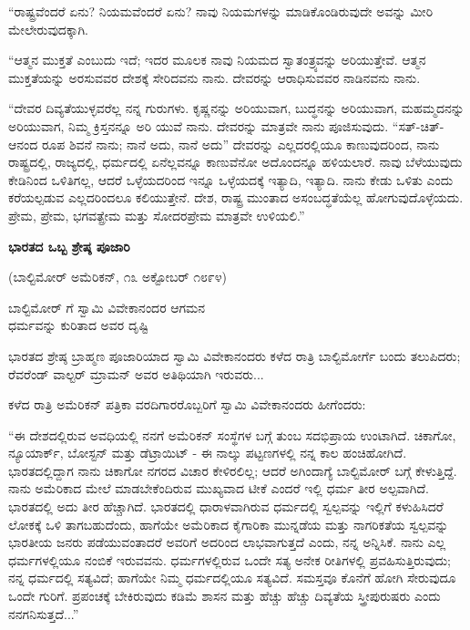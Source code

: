 “ರಾಷ್ಟ್ರವೆಂದರೆ ಏನು? ನಿಯಮವೆಂದರೆ ಏನು? ನಾವು ನಿಯಮಗಳನ್ನು ಮಾಡಿಕೊಂಡಿರುವುದೇ ಅವನ್ನು ಮೀರಿ ಮೇಲೇರುವುದಕ್ಕಾಗಿ.

“ಆತ್ಮನ ಮುಕ್ತತೆ ಎಂಬುದು ಇದೆ; ಇದರ ಮೂಲಕ ನಾವು ನಿಯಮದ ಸ್ವಾತಂತ್ರ್ಯವನ್ನು ಅರಿಯುತ್ತೇವೆ. ಆತ್ಮನ ಮುಕ್ತತೆಯನ್ನು ಅರಸುವವರ ದೇಶಕ್ಕೆ ಸೇರಿದವನು ನಾನು. ದೇವರನ್ನು ಆರಾಧಿಸುವವರ ನಾಡಿನವನು ನಾನು.

“ದೇವರ ದಿವ್ಯತೆಯುಳ್ಳವರೆಲ್ಲ ನನ್ನ ಗುರುಗಳು. ಕೃಷ್ಣನನ್ನು ಅರಿಯುವಾಗ, ಬುದ್ಧನನ್ನು ಅರಿಯುವಾಗ, ಮಹಮ್ಮದನನ್ನು ಅರಿಯುವಾಗ, ನಿಮ್ಮ ಕ್ರಿಸ್ತನನ್ನೂ ಅರಿ ಯುವೆ ನಾನು. ದೇವರನ್ನು ಮಾತ್ರವೇ ನಾನು ಪೂಜಿಸುವುದು. “ಸತ್-ಚಿತ್- ಆನಂದ ರೂಪ ಶಿವನೆ ನಾನು; ನಾನೆ ಅದು, ನಾನೆ ಅದು” ದೇವರನ್ನು ಎಲ್ಲದರಲ್ಲಿಯೂ ಕಾಣುವುದರಿಂದ, ನಾನು ರಾಷ್ಟ್ರದಲ್ಲಿ, ರಾಜ್ಯದಲ್ಲಿ, ಧರ್ಮದಲ್ಲಿ ಏನೆಲ್ಲವನ್ನೂ ಕಾಣುವೆನೋ ಅದೊಂದನ್ನೂ ಹಳಿಯಲಾರೆ. ನಾವು ಬೆಳೆಯುವುದು ಕೇಡಿನಿಂದ ಒಳಿತಿಗಲ್ಲ, ಆದರೆ ಒಳ್ಳೆಯದರಿಂದ ಇನ್ನೂ ಒಳ್ಳೆಯದಕ್ಕೆ ಇತ್ಯಾದಿ, ಇತ್ಯಾದಿ. ನಾನು ಕೇಡು ಒಳಿತು ಎಂದು ಕರೆಯಲ್ಪಡುವ ಎಲ್ಲದರಿಂದಲೂ ಕಲಿಯುತ್ತೇನೆ. ದೇಶ, ರಾಷ್ಟ್ರ ಮುಂತಾದ ಅಸಂಬದ್ಧತೆಯೆಲ್ಲ ಹೋಗುವುದೊಳ್ಳೆಯದು. ಪ್ರೇಮ, ಪ್ರೇಮ, ಭಗವತ್ಪ್ರೇಮ ಮತ್ತು ಸೋದರಪ್ರೇಮ ಮಾತ್ರವೇ ಉಳಿಯಲಿ.”

\begin{center}
\textbf{ಭಾರತದ ಒಬ್ಬ ಶ್ರೇಷ್ಠ ಪೂಜಾರಿ}
\end{center}

\begin{center}
(ಬಾಲ್ಟಿಮೋರ್ ಅಮೆರಿಕನ್, ೧೩ ಅಕ್ಟೋಬರ್ ೧೮೯೪)
\end{center}

\begin{center}
ಬಾಲ್ಟಿಮೋರ್ ಗೆ ಸ್ವಾಮಿ ವಿವೇಕಾನಂದರ ಆಗಮನ\\ಧರ್ಮವನ್ನು ಕುರಿತಾದ ಅವರ ದೃಷ್ಟಿ
\end{center}

ಭಾರತದ ಶ್ರೇಷ್ಠ ಬ್ರಾಹ್ಮಣ ಪೂಜಾರಿಯಾದ ಸ್ವಾಮಿ ವಿವೇಕಾನಂದರು ಕಳೆದ ರಾತ್ರಿ ಬಾಲ್ಟಿಮೋರ್ಗೆ ಬಂದು ತಲುಪಿದರು; ರೆವರೆಂಡ್ ವಾಲ್ಟರ್ ಮ್ರಾಮನ್ ಅವರ ಅತಿಥಿಯಾಗಿ ಇರುವರು...

ಕಳೆದ ರಾತ್ರಿ ಅಮೆರಿಕನ್ ಪತ್ರಿಕಾ ವರದಿಗಾರರೊಬ್ಬರಿಗೆ ಸ್ವಾಮಿ ವಿವೇಕಾನಂದರು ಹೀಗೆಂದರು:

“ಈ ದೇಶದಲ್ಲಿರುವ ಅವಧಿಯಲ್ಲಿ ನನಗೆ ಅಮೆರಿಕನ್ ಸಂಸ್ಥೆಗಳ ಬಗ್ಗೆ ತುಂಬ ಸದಭಿಪ್ರಾಯ ಉಂಟಾಗಿದೆ. ಚಿಕಾಗೋ, ನ್ಯೂಯಾರ್ಕ್, ಬೋಸ್ಟನ್ ಮತ್ತು ಡೆಟ್ರಾಯಿಟ್ - ಈ ನಾಲ್ಕು ಪಟ್ಟಣಗಳಲ್ಲಿ ನನ್ನ ಕಾಲ ಹಂಚಿಹೋಗಿದೆ. ಭಾರತದಲ್ಲಿದ್ದಾಗ ನಾನು ಚಿಕಾಗೋ ನಗರದ ವಿಚಾರ ಕೇಳಿರಲಿಲ್ಲ; ಆದರೆ ಅಗಿಂದಾಗ್ಯೆ ಬಾಲ್ಟಿಮೋರ್ ಬಗ್ಗೆ ಕೇಳುತ್ತಿದ್ದೆ. ನಾನು ಅಮೆರಿಕಾದ ಮೇಲೆ ಮಾಡಬೇಕೆಂದಿರುವ ಮುಖ್ಯವಾದ ಟೀಕೆ ಎಂದರೆ ಇಲ್ಲಿ ಧರ್ಮ ತೀರ ಅಲ್ಪವಾಗಿದೆ. ಭಾರತದಲ್ಲಿ ಅದು ತೀರ ಹೆಚ್ಚಾಗಿದೆ. ಭಾರತದಲ್ಲಿ ಧಾರಾಳವಾಗಿರುವ ಧರ್ಮದಲ್ಲಿ ಸ್ವಲ್ಪವನ್ನು ಇಲ್ಲಿಗೆ ಕಳುಹಿಸಿದರೆ ಲೋಕಕ್ಕೆ ಒಳಿ ತಾಗಬಹುದೆಂದು, ಹಾಗೆಯೇ ಅಮೆರಿಕಾದ ಕೈಗಾರಿಕಾ ಮುನ್ನಡೆಯ ಮತ್ತು ನಾಗರಿಕತೆಯ ಸ್ವಲ್ಪವನ್ನು ಭಾರತೀಯ ಜನರು ಪಡೆಯುವಂತಾದರೆ ಅವರಿಗೆ ಅದರಿಂದ ಲಾಭವಾಗುತ್ತದೆ ಎಂದು, ನನ್ನ ಅನ್ನಿಸಿಕೆ. ನಾನು ಎಲ್ಲ ಧರ್ಮಗಳಲ್ಲಿಯೂ ನಂಬಿಕೆ ಇರುವವನು. ಧರ್ಮಗಳಲ್ಲಿರುವ ಒಂದೇ ಸತ್ಯ ಅನೇಕ ರೀತಿಗಳಲ್ಲಿ ಪ್ರವಹಿಸುತ್ತಿರುವುದು; ನನ್ನ ಧರ್ಮದಲ್ಲಿ ಸತ್ಯವಿದೆ; ಹಾಗೆಯೇ ನಿಮ್ಮ ಧರ್ಮದಲ್ಲಿಯೂ ಸತ್ಯವಿದೆ. ಸಮಸ್ತವೂ ಕೊನೆಗೆ ಹೋಗಿ ಸೇರುವುದೂ ಒಂದೇ ಗುರಿಗೆ. ಪ್ರಪಂಚಕ್ಕೆ ಬೇಕಿರುವುದು ಕಡಿಮೆ ಶಾಸನ ಮತ್ತು ಹೆಚ್ಚು ಹೆಚ್ಚು ದಿವ್ಯತೆಯ ಸ್ತ್ರೀಪುರುಷರು ಎಂದು ನನಗನಿಸುತ್ತದೆ...”

